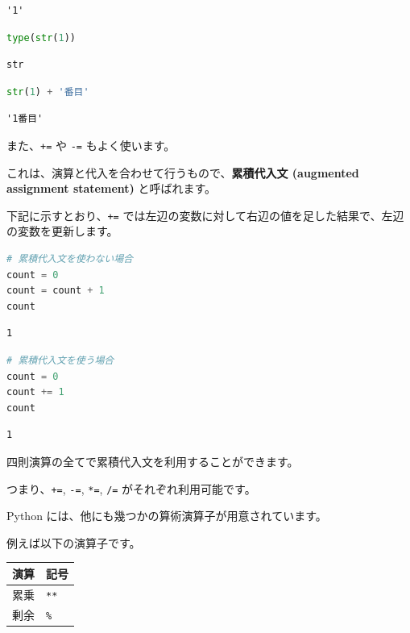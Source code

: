 \begin{lstlisting}[style=outputcell]
'1'
\end{lstlisting}

\begin{lstlisting}[style=codecell,language=Python]
type(str(1))
\end{lstlisting}

\begin{lstlisting}[style=outputcell]
str
\end{lstlisting}

\begin{lstlisting}[style=codecell,language=Python]
str(1) + '番目'
\end{lstlisting}

\begin{lstlisting}[style=outputcell]
'1番目'
\end{lstlisting}

また、\texttt{+=} や \texttt{-=} もよく使います。

これは、演算と代入を合わせて行うもので、\textbf{累積代入文 (augmented assignment statement)} と呼ばれます。


下記に示すとおり、\texttt{+=} では左辺の変数に対して右辺の値を足した結果で、左辺の変数を更新します。


\begin{lstlisting}[style=codecell,language=Python]
# 累積代入文を使わない場合
count = 0
count = count + 1
count
\end{lstlisting}

\begin{lstlisting}[style=outputcell]
1
\end{lstlisting}

\begin{lstlisting}[style=codecell,language=Python]
# 累積代入文を使う場合
count = 0
count += 1
count
\end{lstlisting}

\begin{lstlisting}[style=outputcell]
1
\end{lstlisting}

四則演算の全てで累積代入文を利用することができます。

つまり、\texttt{+=}, \texttt{-=}, \texttt{*=}, \texttt{/=} がそれぞれ利用可能です。


Python には、他にも幾つかの算術演算子が用意されています。

例えば以下の演算子です。


\begin{center}
\begin{tabular}{|l|l|}
\hline
演算 & 記号 \\
\hline
累乗 & \texttt{**} \\
剰余 & \texttt{\%} \\
\hline
\end{tabular}
\end{center}


